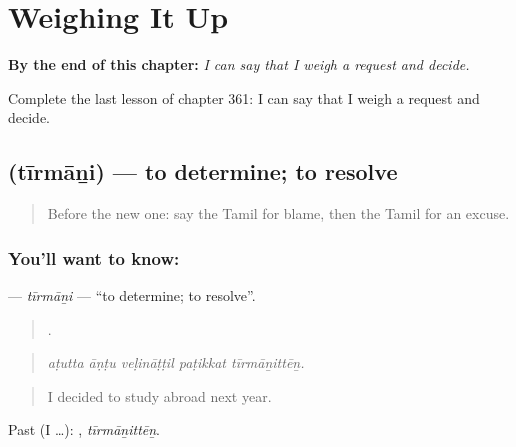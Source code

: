 
\chapter{Weighing It Up}
\label{ch:ta-weighing-it-up}

\begin{chapteropening}
\textbf{By the end of this chapter:} \emph{I can say that I weigh a request and decide.}

Complete the last lesson of chapter 361: I can say that I weigh a request and decide.
\end{chapteropening}

\section[\texorpdfstring{\ta{தீர்மானி} (tīrmāṉi)}{தீர்மானி (tīrmāṉi)}]{ (tīrmāṉi) — to determine; to resolve}

\label{lesson:TA-C361-tirmani}



\begin{quote}
Before the new one: say the Tamil for blame, then the Tamil for an excuse.
\end{quote}

\subsection*{You'll want to know: }
\textbf{} — \emph{tīrmāṉi} — \textquotedblleft{}to determine; to resolve\textquotedblright{}.

\begin{quote}
    .
\end{quote}

\begin{quote}
\emph{aṭutta āṇṭu veḷināṭṭil paṭikkat tīrmāṉittēṉ.}
\end{quote}

\begin{quote}
I decided to study abroad next year.
\end{quote}

Past (I …): , \emph{tīrmāṉittēṉ}.

